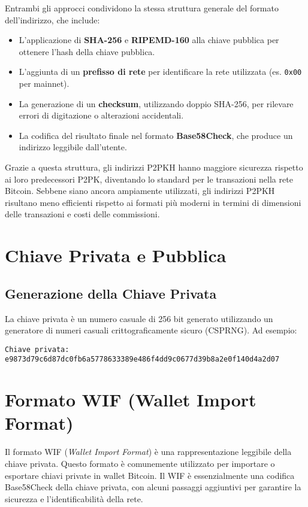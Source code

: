 \documentclass[a4paper,12pt]{article}
\begin{document}
Entrambi gli approcci condividono la stessa struttura generale del formato dell'indirizzo, che include:
\begin{itemize}
    \item L'applicazione di \textbf{SHA-256} e \textbf{RIPEMD-160} alla chiave pubblica per ottenere l'hash della chiave pubblica.
    \item L'aggiunta di un \textbf{prefisso di rete} per identificare la rete utilizzata (es. \texttt{0x00} per mainnet).
    \item La generazione di un \textbf{checksum}, utilizzando doppio SHA-256, per rilevare errori di digitazione o alterazioni accidentali.
    \item La codifica del risultato finale nel formato \textbf{Base58Check}, che produce un indirizzo leggibile dall'utente.
\end{itemize}

Grazie a questa struttura, gli indirizzi P2PKH hanno maggiore sicurezza rispetto ai loro predecessori P2PK, diventando lo standard per le transazioni nella rete Bitcoin. 
Sebbene siano ancora ampiamente utilizzati, gli indirizzi P2PKH risultano meno efficienti rispetto ai formati più moderni in termini di dimensioni delle transazioni e costi delle commissioni.

\section{Chiave Privata e Pubblica}
\subsection{Generazione della Chiave Privata}
La chiave privata è un numero casuale di 256 bit generato utilizzando un generatore di numeri casuali crittograficamente sicuro (CSPRNG). Ad esempio:
\begin{verbatim}
Chiave privata:
e9873d79c6d87dc0fb6a5778633389e486f4dd9c0677d39b8a2e0f140d4a2d07
\end{verbatim}

\section{Formato WIF (Wallet Import Format)}
Il formato WIF (\textit{Wallet Import Format}) è una rappresentazione leggibile della chiave privata. Questo formato è comunemente utilizzato per importare o esportare chiavi private in wallet Bitcoin. Il WIF è essenzialmente una codifica Base58Check della chiave privata, con alcuni passaggi aggiuntivi per garantire la sicurezza e l'identificabilità della rete.
\end{document}

